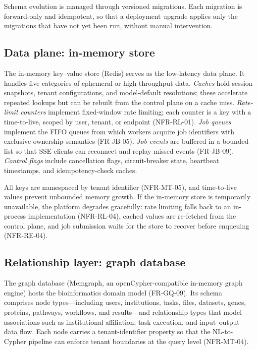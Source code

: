 \documentclass[a4paper]{sapthesis}
\begin{document}
Schema evolution is managed through versioned migrations.  Each migration
is forward-only and idempotent, so that a deployment upgrade applies only
the migrations that have not yet been run, without manual intervention.

\subsection{Data plane: in-memory store}

The in-memory key--value store (Redis) serves as the low-latency data
plane.  It handles five categories of ephemeral or high-throughput data.
\emph{Caches} hold session snapshots, tenant configurations, and
model-default resolutions; these accelerate repeated lookups but can be
rebuilt from the control plane on a cache miss.  \emph{Rate-limit counters}
implement fixed-window rate limiting; each counter is a key with
a time-to-live, scoped by user, tenant, or endpoint (NFR-RL-01).
\emph{Job queues} implement the FIFO queues from which workers acquire
job identifiers with exclusive ownership semantics (FR-JB-05).  \emph{Job events} are buffered in a bounded list so that
SSE clients can reconnect and replay missed events (FR-JB-09).
\emph{Control flags} include cancellation flags, circuit-breaker state,
heartbeat timestamps, and idempotency-check caches.

All keys are namespaced by tenant identifier (NFR-MT-05), and
time-to-live values prevent unbounded memory growth.  If the in-memory
store is temporarily unavailable, the platform degrades gracefully:
rate limiting falls back to an in-process implementation (NFR-RL-04),
cached values are re-fetched from the control plane, and job submission
waits for the store to recover before enqueuing (NFR-RE-04).

\subsection{Relationship layer: graph database}

The graph database (Memgraph, an openCypher-compatible in-memory graph
engine) hosts the bioinformatics domain model (FR-GQ-09).  Its schema
comprises node types---including users, institutions, tasks,
files, datasets, genes, proteins, pathways, workflows, and
results---and relationship types that model associations such as
institutional affiliation, task execution, and input--output data flow.  Each node
carries a tenant-identifier property so that the NL-to-Cypher pipeline can
enforce tenant boundaries at the query level (NFR-MT-04).
\end{document}
